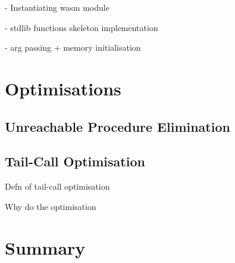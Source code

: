 \documentclass[00-main.tex]{subfiles}
\begin{document}
\begin{Comment}
- Instantiating wasm module

- stdlib functions skeleton implementation

- arg passing + memory initialisation
\end{Comment}

\section{Optimisations}

\subsection{Unreachable Procedure Elimination}

\subsection{Tail-Call Optimisation}

\begin{Comment}
Defn of tail-call optimisation

Why do the optimisation
\end{Comment}

\section{Summary}
\end{document}
